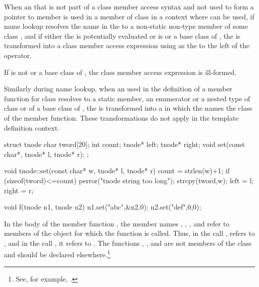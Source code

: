 \pnum
When an  that is not part of a
class member access syntax and not used to form a
pointer to member is used in
a member of class  in a context where  can be
used,
if name
lookup resolves the name in the
 to a non-static non-type member of some class
,
and if either the  is potentially evaluated or
 is  or a base class of ,
the  is transformed into a class
member access expression using
 as the 
to the left of the  operator.
\begin{note}
If  is not  or a base class of , the class
member access expression is ill-formed.
\end{note}
Similarly during name lookup, when an
 used in the definition of a
member function for class  resolves to a static member,
an enumerator or a nested type of class  or of a base class of
, the  is transformed into a
 in which the
 names the class of the member function.
These transformations do not apply in the
template definition context.
\begin{example}

\begin{codeblock}
struct tnode {
  char tword[20];
  int count;
  tnode* left;
  tnode* right;
  void set(const char*, tnode* l, tnode* r);
};

void tnode::set(const char* w, tnode* l, tnode* r) {
  count = strlen(w)+1;
  if (sizeof(tword)<=count)
      perror("tnode string too long");
  strcpy(tword,w);
  left = l;
  right = r;
}

void f(tnode n1, tnode n2) {
  n1.set("abc",&n2,0);
  n2.set("def",0,0);
}
\end{codeblock}

In the body of the member function , the member names
, , , and  refer to
members of the object for which the function is called. Thus, in the
call ,  refers to
, and in the call , it refers
to . The functions , , and
 are not members of the class  and should be
declared elsewhere.\footnote{See, for example, .}
\end{example}

